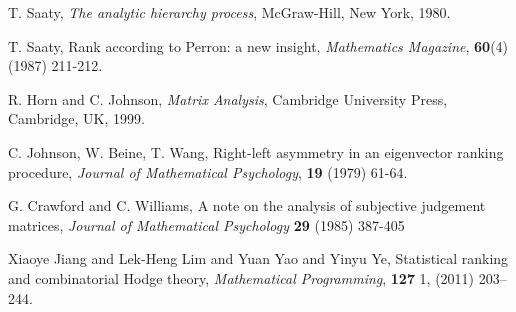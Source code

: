 \documentclass[a4,11pt,twoside,leqno]{report}
\theoremstyle{definition}
\theoremstyle{remark}
\numberwithin{equation}{section}
\begin{document}
\begin{thebibliography}{1}

   T. Saaty, {\em The analytic hierarchy process}, McGraw-Hill, New York, 1980. 
  
   T. Saaty, Rank according to Perron: a new insight, {\em Mathematics Magazine}, {\bf 60}(4) (1987) 211-212.

   R. Horn and C. Johnson, {\em Matrix Analysis}, Cambridge University Press, Cambridge, UK, 1999.

   C. Johnson, W. Beine, T. Wang, Right-left asymmetry in an eigenvector ranking procedure, {\em Journal of Mathematical Psychology}, {\bf 19} (1979) 61-64.
  
   G. Crawford and C. Williams, A note on the analysis of subjective judgement matrices, {\em Journal of Mathematical Psychology} {\bf 29} (1985) 387-405
  
   Xiaoye Jiang and Lek-Heng Lim and Yuan Yao and
Yinyu Ye, Statistical ranking and combinatorial Hodge theory, \emph{Mathematical
Programming}, \textbf{127} 1, (2011) 203--244. 
  
  
  
  
   
  




  \end{thebibliography}
\end{document}
